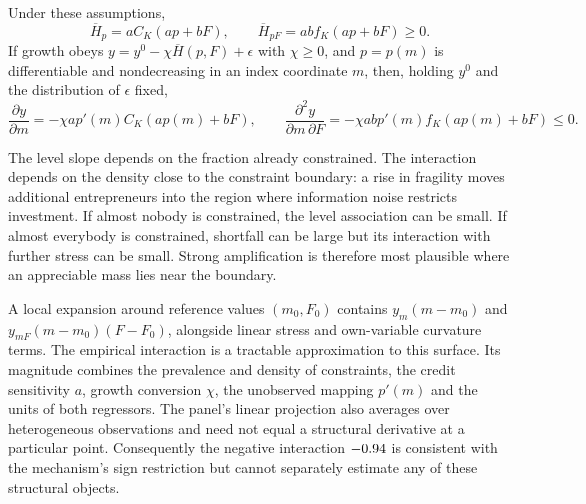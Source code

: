 \begin{proposition}\label{prop:aggregation}
Under these assumptions,
\begin{equation}\label{eq:aggregate-derivatives}
 \overline H_p=aC_K(ap+bF),\qquad
 \overline H_{pF}=ab f_K(ap+bF)\ge0.
\end{equation}
If growth obeys $y=y^0-\chi\overline H(p,F)+\epsilon$ with $\chi\ge0$,
and $p=p(m)$ is differentiable and nondecreasing in an index coordinate $m$,
then, holding $y^0$ and the distribution of $\epsilon$ fixed,
\begin{equation}\label{eq:growth-cross}
 \frac{\partial y}{\partial m}
 =-\chi a p'(m)C_K(ap(m)+bF),\qquad
 \frac{\partial^2 y}{\partial m\,\partial F}
 =-\chi ab p'(m)f_K(ap(m)+bF)\le0.
\end{equation}
\end{proposition}

The level slope depends on the fraction already constrained. The interaction
depends on the density close to the constraint boundary: a rise in fragility
moves additional entrepreneurs into the region where information noise
restricts investment. If almost nobody is constrained, the level association
can be small. If almost everybody is constrained, shortfall can be large but
its interaction with further stress can be small. Strong amplification is
therefore most plausible where an appreciable mass lies near the boundary.

A local expansion around reference values $(m_0,F_0)$ contains
$y_m(m-m_0)$ and $y_{mF}(m-m_0)(F-F_0)$, alongside linear stress and
own-variable curvature terms. The empirical interaction is a tractable
approximation to this surface. Its magnitude combines the prevalence and
density of constraints, the credit sensitivity $a$, growth conversion $\chi$,
the unobserved mapping $p'(m)$ and the units of both regressors. The panel's
linear projection also averages over heterogeneous observations and need not
equal a structural derivative at a particular point. Consequently the
negative interaction $-0.94$ is consistent with the mechanism's sign
restriction but cannot separately estimate any of these structural objects.

